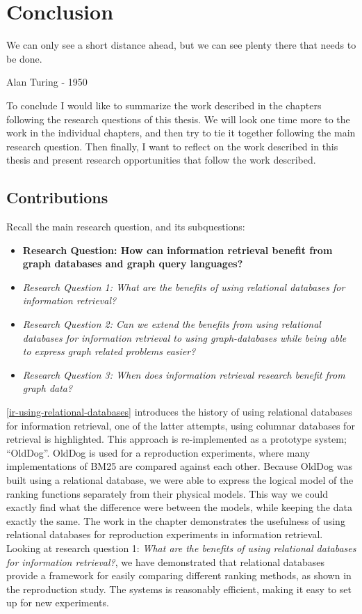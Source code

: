 \chapter{Conclusion}
\label{conclusion}
\epigraph{We can only see a short distance ahead, but we can see plenty there that needs to be done.}{Alan Turing - 1950}

To conclude I would like to summarize the work described in the chapters following the research questions of this thesis. We will look one time more to the work in the individual chapters, and then try to tie it together following the main research question. Then finally, I want to reflect on the work described in this thesis and present research opportunities that follow the work described. 

\section{Contributions}
Recall the main research question, and its subquestions:
\begin{itemize}
	\item \textbf{Research Question: How can information retrieval benefit from graph databases and graph query languages?}
	\item \emph{Research Question 1: What are the benefits of using relational databases for information retrieval?} 
	\item \emph{Research Question 2: Can we extend the benefits from using relational databases for information retrieval to using graph-databases while being able to express graph related problems easier?} 
	\item \emph{Research Question 3: When does information retrieval research benefit from graph data?} 
\end{itemize}

\cref{ir-using-relational-databases} introduces the history of using relational databases for information retrieval, one of the latter attempts, using columnar databases for retrieval is highlighted. This approach is re-implemented as a prototype system; ``OldDog''. OldDog is used for a reproduction experiments, where many implementations of BM25 are compared against each other. Because OldDog was built using a relational database, we were able to express the logical model of the ranking functions separately from their physical models. This way we could exactly find what the difference were between the models, while keeping the data exactly the same. The work in the chapter demonstrates the usefulness of using relational databases for reproduction experiments in information retrieval. Looking at research question 1: \emph{What are the benefits of using relational databases for information retrieval?}, we have demonstrated that relational databases provide a framework for easily comparing different ranking methods, as shown in the reproduction study. The systems is reasonably efficient, making it easy to set up for new experiments. 


